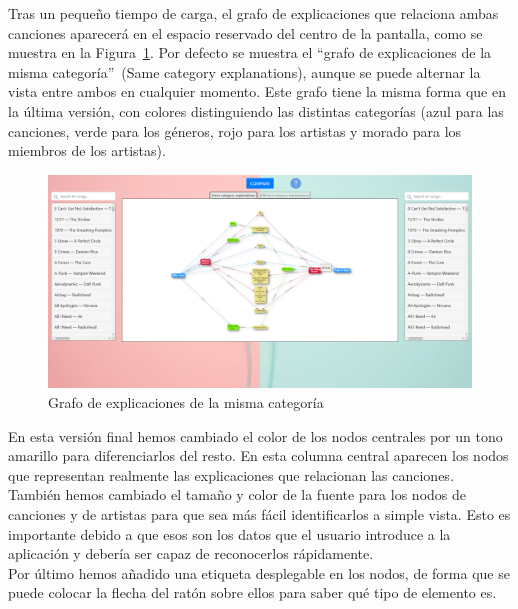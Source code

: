Tras un pequeño tiempo de carga, el grafo de explicaciones que relaciona ambas canciones aparecerá en el espacio reservado del centro de la pantalla, como se muestra en la Figura~\ref{fig:mismaCategoria}. Por defecto se muestra el ``grafo de explicaciones de la misma categoría''~(Same category explanations), aunque se puede alternar la vista entre ambos en cualquier momento. Este grafo tiene la misma forma que en la última versión, con colores distinguiendo las distintas categorías (azul para las canciones, verde para los géneros, rojo para los artistas y morado para los miembros de los artistas).\\

\clearpage

\begin{figure}[h!]
	\centering
	\includegraphics[width = 1\textwidth]{Imagenes/Bitmap/Pantalla same graph.png}
	\caption{Grafo de explicaciones de la misma categoría}
	\label{fig:mismaCategoria}
\end{figure}

En esta versión final hemos cambiado el color de los nodos centrales por un tono amarillo para diferenciarlos del resto. En esta columna central aparecen los nodos que representan realmente las explicaciones que relacionan las canciones.\\

También hemos cambiado el tamaño y color de la fuente para los nodos de canciones y de artistas para que sea más fácil identificarlos a simple vista. Esto es importante debido a que esos son los datos que el usuario introduce a la aplicación y debería ser capaz de reconocerlos rápidamente.\\

Por último hemos añadido una etiqueta desplegable en los nodos, de forma que se puede colocar la flecha del ratón sobre ellos para saber qué tipo de elemento es.\\

